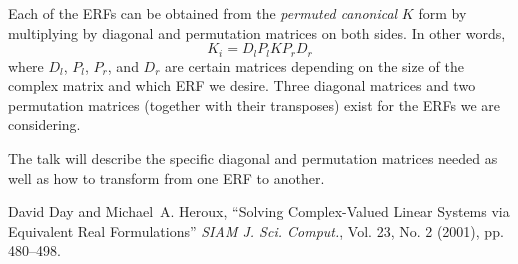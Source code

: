 \documentclass{report}
\begin{document}
Each of the ERFs can be obtained from the \emph{permuted canonical} $K$
form by multiplying by diagonal and permutation matrices on both sides.
In other words,
\begin{equation*}
\label{kiform} K_i = D_l P_l K P_r D_r
\end{equation*}
where $D_l$, $P_l$, $P_r$, and $D_r$ are certain matrices depending on
the size of the complex matrix and which ERF we desire. Three diagonal
matrices and two permutation matrices (together with their transposes)
exist for the ERFs we are considering.

The talk will describe the specific diagonal and permutation
matrices needed as well as how to transform from one ERF to another.

\begin{thebibliography}{1}
David Day and Michael~A. Heroux, ``Solving Complex-Valued Linear
Systems via Equivalent Real Formulations'' \emph{SIAM J. Sci.
Comput.}, Vol. 23, No. 2 (2001), pp. 480--498.
\end{thebibliography}
\end{document}
